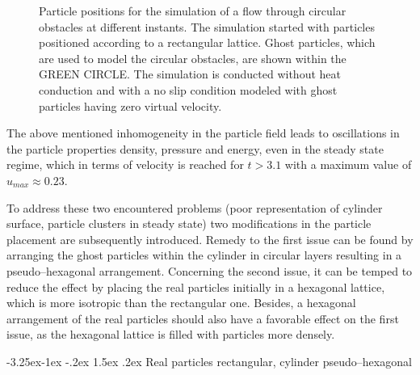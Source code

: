 \documentclass{report}
\makeatletter
\renewcommand\paragraph{\@startsection{paragraph}{4}{\z@}%
  {-3.25ex\@plus -1ex \@minus -.2ex}%
  {1.5ex \@plus .2ex}%
  {\normalfont\normalsize\bfseries}}
\makeatother
\begin{document}
\begin{figure}[!htbp]
{}

\caption[particle positions for Porosities]{Particle positions for the simulation of a flow through circular obstacles at different instants. The simulation started with particles positioned according to a rectangular lattice. Ghost particles, which are used to model the circular obstacles, are shown within the GREEN CIRCLE. The simulation is conducted without heat conduction and with a no slip condition modeled with ghost particles having zero virtual velocity.}

\end{figure}

The above mentioned inhomogeneity in the particle field leads to oscillations in the particle properties density, pressure and energy, even in the steady state regime, which in terms of velocity is reached for $t>3.1$ with a maximum value of $u_\mathit{max}\approx 0.23$. 

To address these two encountered problems (poor representation of cylinder surface, particle clusters in steady state) two modifications in the particle placement are subsequently introduced. Remedy to the first issue can be found by arranging the ghost particles within the cylinder in circular layers resulting in a pseudo--hexagonal arrangement. Concerning the second issue, it can be temped to reduce the effect by placing the real particles initially in a hexagonal lattice, which is more isotropic than the rectangular one. Besides, a hexagonal arrangement of the real particles should also have a favorable effect on the first issue, as the hexagonal lattice is filled with particles more densely.

\paragraph{Real particles rectangular, cylinder pseudo--hexagonal}
\end{document}
